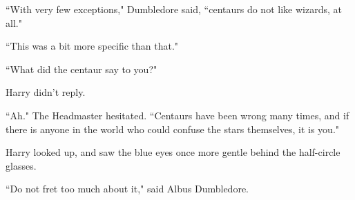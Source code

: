 ``With very few exceptions," Dumbledore said, ``centaurs do not like wizards, at all."

``This was a bit more specific than that."

``What did the centaur say to you?"

Harry didn't reply.

``Ah." The Headmaster hesitated. ``Centaurs have been wrong many times, and if there is anyone in the world who could confuse the stars themselves, it is you."

Harry looked up, and saw the blue eyes once more gentle behind the half-circle glasses.

``Do not fret too much about it," said Albus Dumbledore.

